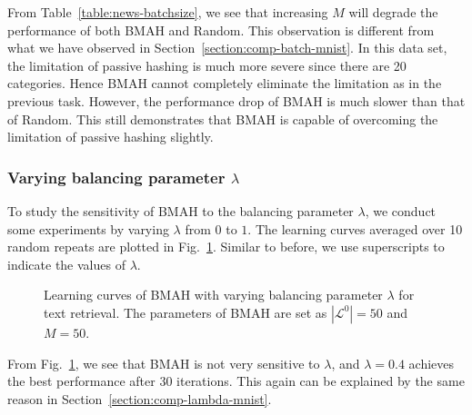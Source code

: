 From Table~\ref{table:news-batchsize}, we see that increasing $M$ will degrade the performance of both \mbox{BMAH} and \mbox{Random}. This observation is different from what we have observed in Section~\ref{section:comp-batch-mnist}. In this data set, the limitation of passive hashing is much more severe since there are 20 categories. Hence \mbox{BMAH} cannot completely eliminate the limitation as in the previous task. However, the performance drop of \mbox{BMAH} is much slower than that of \mbox{Random}. This still demonstrates that \mbox{BMAH} is capable of overcoming the limitation of passive hashing slightly.

\subsubsection{Varying balancing parameter $\lambda$}

To study the sensitivity of \mbox{BMAH} to the balancing parameter $\lambda$, we conduct some experiments by varying $\lambda$ from $0$ to $1$. The learning curves averaged over 10 random repeats are plotted in Fig.~\ref{fig:apt-news-24b-qp}. Similar to before, we use superscripts to indicate the values of $\lambda$.

\begin{figure}[htb]
\caption{Learning curves of \mbox{BMAH} with varying balancing parameter $\lambda$ for text retrieval. The parameters of \mbox{BMAH} are set as $|\mathcal{L}^{0}|=50$ and $M = 50$.}
\label{fig:apt-news-24b-qp}
\end{figure}

From Fig.~\ref{fig:apt-news-24b-qp}, we see that \mbox{BMAH} is not very sensitive to $\lambda$, and $\lambda=0.4$ achieves the best performance after 30 iterations. This again can be explained by the same reason in Section~\ref{section:comp-lambda-mnist}.

